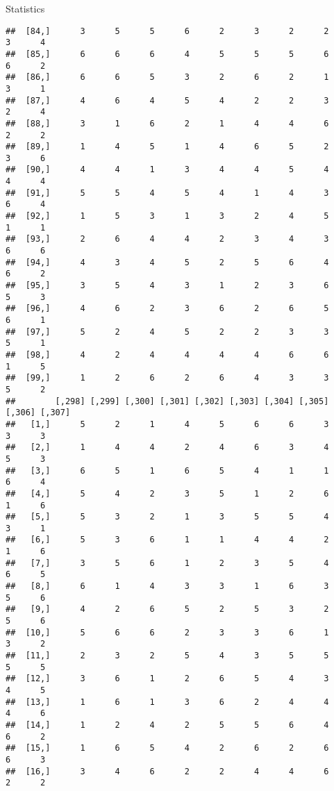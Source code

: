 \documentclass[
  ignorenonframetext,
]{beamer}
\begin{document}
\begin{frame}[fragile]{Statistics}
\begin{verbatim}
##  [84,]      3      5      5      6      2      3      2      2      3      4
##  [85,]      6      6      6      4      5      5      5      6      6      2
##  [86,]      6      6      5      3      2      6      2      1      3      1
##  [87,]      4      6      4      5      4      2      2      3      2      4
##  [88,]      3      1      6      2      1      4      4      6      2      2
##  [89,]      1      4      5      1      4      6      5      2      3      6
##  [90,]      4      4      1      3      4      4      5      4      4      4
##  [91,]      5      5      4      5      4      1      4      3      6      4
##  [92,]      1      5      3      1      3      2      4      5      1      1
##  [93,]      2      6      4      4      2      3      4      3      6      6
##  [94,]      4      3      4      5      2      5      6      4      6      2
##  [95,]      3      5      4      3      1      2      3      6      5      3
##  [96,]      4      6      2      3      6      2      6      5      6      1
##  [97,]      5      2      4      5      2      2      3      3      5      1
##  [98,]      4      2      4      4      4      4      6      6      1      5
##  [99,]      1      2      6      2      6      4      3      3      5      2
##        [,298] [,299] [,300] [,301] [,302] [,303] [,304] [,305] [,306] [,307]
##   [1,]      5      2      1      4      5      6      6      3      3      3
##   [2,]      1      4      4      2      4      6      3      4      5      3
##   [3,]      6      5      1      6      5      4      1      1      6      4
##   [4,]      5      4      2      3      5      1      2      6      1      6
##   [5,]      5      3      2      1      3      5      5      4      3      1
##   [6,]      5      3      6      1      1      4      4      2      1      6
##   [7,]      3      5      6      1      2      3      5      4      6      5
##   [8,]      6      1      4      3      3      1      6      3      5      6
##   [9,]      4      2      6      5      2      5      3      2      5      6
##  [10,]      5      6      6      2      3      3      6      1      3      2
##  [11,]      2      3      2      5      4      3      5      5      5      5
##  [12,]      3      6      1      2      6      5      4      3      4      5
##  [13,]      1      6      1      3      6      2      4      4      4      6
##  [14,]      1      2      4      2      5      5      6      4      6      2
##  [15,]      1      6      5      4      2      6      2      6      6      3
##  [16,]      3      4      6      2      2      4      4      6      2      2

\end{verbatim}
\end{frame}
\end{document}
